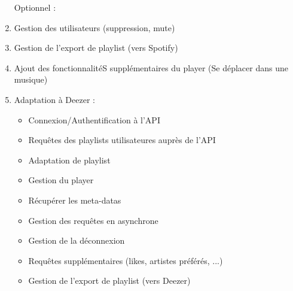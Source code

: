 \documentclass{article}
\begin{document}
\begin{enumerate}[resume]
			      \begin{description}
			      	\item[Optionnel :]
			      \end{description}                 
			\item Gestion des utilisateurs (suppression, mute)\label{gestion_utilisateur_item}
			\item Gestion de l'export de playlist (vers Spotify)\label{export_playlist_item}
			\item Ajout des fonctionnalitéS supplémentaires du player (Se déplacer dans une musique)\label{player_gestion_sup_item}
			\item Adaptation à Deezer :\label{deezer_item}
			      \begin{itemize}
			      	\item Connexion/Authentification à l'API
			      	\item Requêtes des playlists utilisateures auprès de l'API
			      	\item Adaptation de playlist
			      	\item Gestion du player
			      	\item Récupérer les meta-datas
			      	\item Gestion des requêtes en asynchrone
			      	\item Gestion de la déconnexion
			      	\item Requêtes supplémentaires (likes, artistes préférés, ...)
			      	\item Gestion de l'export de playlist (vers Deezer)
			      \end{itemize}
		\end{enumerate}
\end{document}
